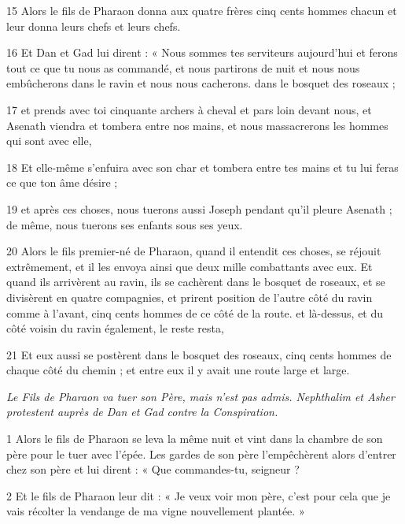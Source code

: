 \par 15 Alors le fils de Pharaon donna aux quatre frères cinq cents hommes chacun et leur donna leurs chefs et leurs chefs.

\par 16 Et Dan et Gad lui dirent : « Nous sommes tes serviteurs aujourd'hui et ferons tout ce que tu nous as commandé, et nous partirons de nuit et nous nous embûcherons dans le ravin et nous nous cacherons. dans le bosquet des roseaux ;

\par 17 et prends avec toi cinquante archers à cheval et pars loin devant nous, et Asenath viendra et tombera entre nos mains, et nous massacrerons les hommes qui sont avec elle,

\par 18 Et elle-même s'enfuira avec son char et tombera entre tes mains et tu lui feras ce que ton âme désire ;

\par 19 et après ces choses, nous tuerons aussi Joseph pendant qu'il pleure Asenath ; de même, nous tuerons ses enfants sous ses yeux.

\par 20 Alors le fils premier-né de Pharaon, quand il entendit ces choses, se réjouit extrêmement, et il les envoya ainsi que deux mille combattants avec eux. Et quand ils arrivèrent au ravin, ils se cachèrent dans le bosquet de roseaux, et se divisèrent en quatre compagnies, et prirent position de l'autre côté du ravin comme à l'avant, cinq cents hommes de ce côté de la route. et là-dessus, et du côté voisin du ravin également, le reste resta,

\par 21 Et eux aussi se postèrent dans le bosquet des roseaux, cinq cents hommes de chaque côté du chemin ; et entre eux il y avait une route large et large.



\par \textit{Le Fils de Pharaon va tuer son Père, mais n'est pas admis. Nephthalim et Asher protestent auprès de Dan et Gad contre la Conspiration.}


\par 1 Alors le fils de Pharaon se leva la même nuit et vint dans la chambre de son père pour le tuer avec l'épée. Les gardes de son père l'empêchèrent alors d'entrer chez son père et lui dirent : « Que commandes-tu, seigneur ?

\par 2 Et le fils de Pharaon leur dit : « Je veux voir mon père, c'est pour cela que je vais récolter la vendange de ma vigne nouvellement plantée. »

